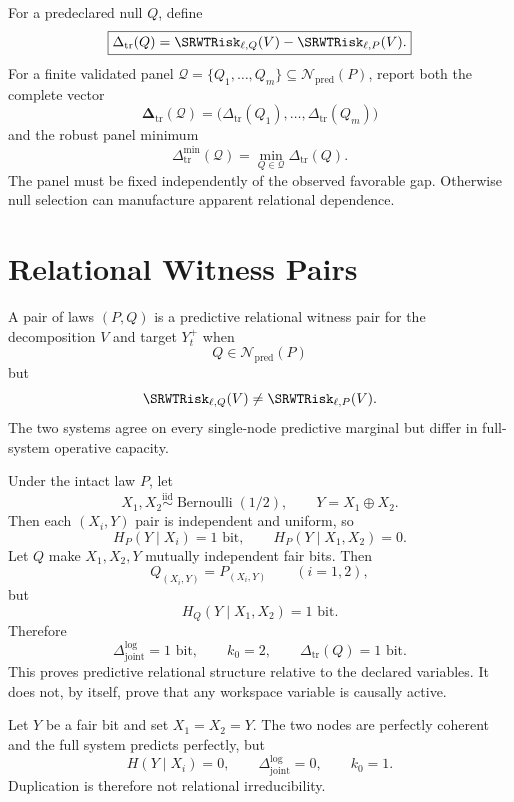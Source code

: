 For a predeclared null \(Q\), define
\[
\boxed{
\Delta_{\mathrm{tr}}(Q)
=
\SRWTRisk_{\ell,Q}(V)
-
\SRWTRisk_{\ell,P}(V).
}
\]
For a finite validated panel
\(\mathcal Q=\{Q_1,\ldots,Q_m\}\subseteq\mathcal N_{\mathrm{pred}}(P)\), report
both the complete vector
\[
\boldsymbol\Delta_{\mathrm{tr}}(\mathcal Q)
=
\bigl(
\Delta_{\mathrm{tr}}(Q_1),\ldots,
\Delta_{\mathrm{tr}}(Q_m)
\bigr)
\]
and the robust panel minimum
\[
\Delta_{\mathrm{tr}}^{\min}(\mathcal Q)
=
\min_{Q\in\mathcal Q}\Delta_{\mathrm{tr}}(Q).
\]
The panel must be fixed independently of the observed favorable gap. Otherwise
null selection can manufacture apparent relational dependence.

\section{Relational Witness Pairs}

\begin{SRWTdefinition}\label{SRWT:def:relational-witness}
A pair of laws \((P,Q)\) is a predictive relational witness pair for the
decomposition \(V\) and target \(Y_t^+\) when
\[
Q\in\mathcal N_{\mathrm{pred}}(P)
\]
but
\[
\SRWTRisk_{\ell,Q}(V)
\neq
\SRWTRisk_{\ell,P}(V).
\]
The two systems agree on every single-node predictive marginal but differ in
full-system operative capacity.
\end{SRWTdefinition}

\begin{SRWTexample}\label{SRWT:ex:xor-witness}
Under the intact law \(P\), let
\[
X_1,X_2\overset{\mathrm{iid}}{\sim}\operatorname{Bernoulli}(1/2),
\qquad
Y=X_1\oplus X_2.
\]
Then each \((X_i,Y)\) pair is independent and uniform, so
\[
H_P(Y\mid X_i)=1\text{ bit},
\qquad
H_P(Y\mid X_1,X_2)=0.
\]
Let \(Q\) make \(X_1,X_2,Y\) mutually independent fair bits. Then
\[
Q_{(X_i,Y)}=P_{(X_i,Y)}
\qquad(i=1,2),
\]
but
\[
H_Q(Y\mid X_1,X_2)=1\text{ bit}.
\]
Therefore
\[
\Delta_{\mathrm{joint}}^{\log}=1\text{ bit},
\qquad
k_0=2,
\qquad
\Delta_{\mathrm{tr}}(Q)=1\text{ bit}.
\]
This proves predictive relational structure relative to the declared variables.
It does not, by itself, prove that any workspace variable is causally active.
\end{SRWTexample}

\begin{SRWTexample}
Let \(Y\) be a fair bit and set \(X_1=X_2=Y\). The two nodes are perfectly
coherent and the full system predicts perfectly, but
\[
H(Y\mid X_i)=0,
\qquad
\Delta_{\mathrm{joint}}^{\log}=0,
\qquad
k_0=1.
\]
Duplication is therefore not relational irreducibility.
\end{SRWTexample}

